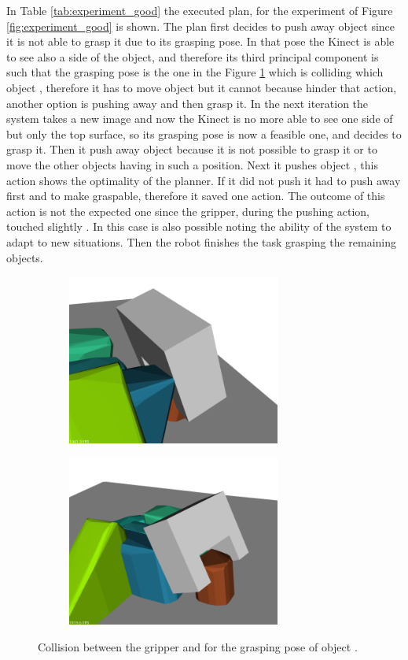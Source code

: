 In Table \ref{tab:experiment_good} the executed plan, for the experiment of Figure \ref{fig:experiment_good} is shown. The plan first decides to push away object  since it is not able to grasp it due to its grasping pose. In that pose the Kinect is able to see also a side of the object, and therefore its third principal component is such that the grasping pose is the one in the Figure \ref{fig:exp_good_grasp_o2} which is colliding which object , therefore it has to move object  but it cannot because  hinder that action, another option is pushing away  and then grasp it. In the next iteration the system takes a new image and now the Kinect is no more able to see one side of  but only the top surface, so its grasping pose is now a feasible one, and decides to grasp it. Then it push away object  because it is not possible to grasp it or to move the other objects having  in such a position. Next it pushes object , this action shows the optimality of the planner. If it did not push  it had to push away first  and  to make  graspable, therefore it saved one action. The outcome of this action is not the expected one since the gripper, during the pushing action, touched slightly . In this case is also possible noting the ability of the system to adapt to new situations. Then the robot finishes the task grasping the remaining objects.

\begin{figure}
\centering
\begin{subfigure}[t]{0.45\textwidth}
\centering
\includegraphics[width = 7cm]{Img/experiments/exp_good/grasp_o2.png}
\caption{}
\end{subfigure}
\begin{subfigure}[t]{0.45\textwidth}
\centering
\includegraphics[width = 7cm]{Img/experiments/exp_good/grasp_o2_2.png}
\caption{}
\end{subfigure}
\caption{Collision between the gripper and  for the grasping pose of object .}\label{fig:exp_good_grasp_o2}
\end{figure}

